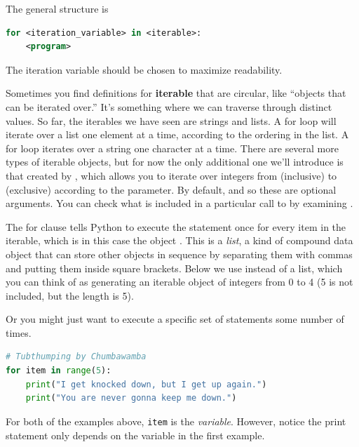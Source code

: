 The general structure is 
\begin{lstlisting}[language = Pascal] 
for <iteration_variable> in <iterable>:
    <program>
\end{lstlisting}
The iteration variable should be chosen to maximize readability. 

Sometimes you find definitions for \textbf{iterable} that are circular, like ``objects that can be iterated over.'' It's something where we can traverse through distinct values. So far, the iterables we have seen are strings and lists. A for loop will iterate over a list one element at a time, according to the ordering in the list. A for loop iterates over a string one character at a time. There are several more types of iterable objects, but for now the only additional one we'll introduce is that created by , which allows you to iterate over integers from  (inclusive) to  (exclusive) according to the  parameter. By default,  and  so these are optional arguments. You can check what is included in a particular call to  by examining .

\smallskip

\noindent The for clause tells Python to execute the statement once for every item in the iterable, which is
in this case the object . This is a \emph{list}, a kind of 
compound data object that can store other objects in sequence by separating them with commas and putting
them inside square brackets. Below we use  instead of a list, which you
can think of as generating an iterable object of integers from 0 to 4 (5 is not included, but the length is 5).


\smallskip

\noindent Or you might just want to execute a specific set of statements some number of times.


\begin{lstlisting}[language = Python]
# Tubthumping by Chumbawamba
for item in range(5):
    print("I get knocked down, but I get up again.")
    print("You are never gonna keep me down.") \end{lstlisting}

\smallskip

\noindent For both of the examples above, \lstinline[language = Python]{item} is the \emph{variable}. However, notice
the print statement only depends on the variable in the first example.

